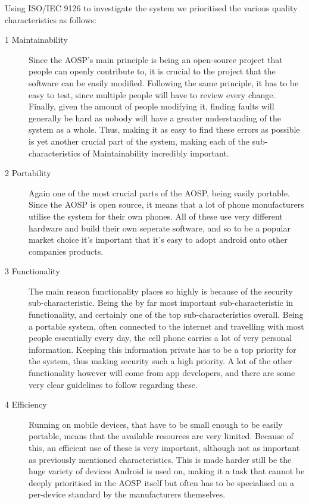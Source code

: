 \documentclass[conference]{IEEEtran}
\begin{document}
Using ISO/IEC 9126\cite{jung2004} to investigate the system we prioritised the various quality characteristics as follows: \\
    

\begin{description}
\item[1 Maintainability] Since the AOSP's main principle is being an open-source project that people can openly contribute to, it is crucial to the project that the software can be easily modified. Following the same principle, it has to be easy to test, since multiple people will have to review every change. Finally, given the amount of people modifying it, finding faults will generally be hard as nobody will have a greater understanding of the system as a whole. Thus, making it as easy to find these errors as possible is yet another crucial part of the system, making each of the sub-characteristics of Maintainability incredibly important. 
\item[2 Portability] Again one of the most crucial parts of the AOSP, being easily portable. Since the AOSP is open source, it means that a lot of phone monufacturers utilise the system for their own phones. All of these use very different hardware and build their own seperate software, and so to be a popular market choice it's important that it's easy to adopt android onto other companies products.
\item[3 Functionality] The main reason functionality places so highly is because of the security sub-characteristic. Being the by far most important sub-characteristic in functionality, and certainly one of the top sub-characteristics overall. Being a portable system, often connected to the internet and travelling with most people essentially every day, the cell phone carries a lot of very personal information. Keeping this information private has to be a top priority for the system, thus making security such a high priority. A lot of the other functionality however will come from app developers, and there are some very clear guidelines to follow regarding these.\cite{android-quality}
\item[4 Efficiency]  Running on mobile devices, that have to be small enough to be easily portable, means that the available resources are very limited. Because of this, an efficient use of these is very important, although not as important as previously mentioned characteristics. This is made harder still be the huge variety of devices Android is used on, making it a task that cannot be deeply prioritised in the AOSP itself but often has to be specialised on a per-device standard by the manufacturers themselves. 

\end{description}
\end{document}
